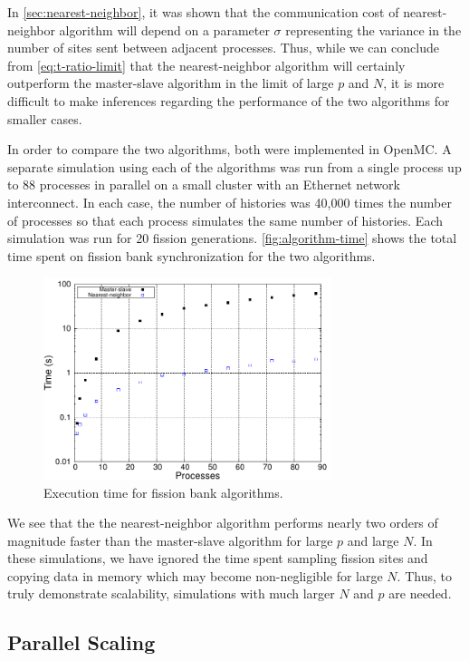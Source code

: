 In \autoref{sec:nearest-neighbor}, it was shown that the communication cost of
nearest-neighbor algorithm will depend on a parameter $\sigma$ representing the
variance in the number of sites sent between adjacent processes. Thus, while we
can conclude from \eqref{eq:t-ratio-limit} that the nearest-neighbor algorithm
will certainly outperform the master-slave algorithm in the limit of large $p$
and $N$, it is more difficult to make inferences regarding the performance of
the two algorithms for smaller cases.

In order to compare the two algorithms, both were implemented in OpenMC. A
separate simulation using each of the algorithms was run from a single process
up to 88 processes in parallel on a small cluster with an Ethernet network
interconnect. In each case, the number of histories was 40,000 times the number
of processes so that each process simulates the same number of histories. Each
simulation was run for 20 fission generations. \autoref{fig:algorithm-time}
shows the total time spent on fission bank synchronization for the two
algorithms.
\begin{figure}[ht!]
  \centering
  \includegraphics[width=0.75\textwidth]{figures/ch3/algorithm_results/time.pdf}
  \caption{Execution time for fission bank algorithms.}
  \label{fig:algorithm-time}
\end{figure}
We see that the the nearest-neighbor algorithm performs nearly two orders of
magnitude faster than the master-slave algorithm for large $p$ and large $N$. In
these simulations, we have ignored the time spent sampling fission sites and
copying data in memory which may become non-negligible for large $N$. Thus, to
truly demonstrate scalability, simulations with much larger $N$ and $p$ are
needed.

\subsection{Parallel Scaling}

